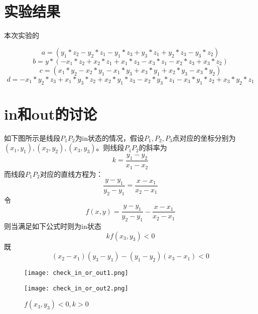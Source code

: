 \documentclass[10pt]{article}
\begin{document}
\section{实验结果}
本次实验的

$$a=(y_1*z_2 - y_2*z_1 - y_1*z_3+ y_3*z_1+ y_2*z_3- y_3*z_2)$$
$$b=y*(- x_1*z_2 + x_2*z_1+ x_1*z_3- x_3*z_1- x_2*z_3+ x_3*z_2)$$
$$c=(x_1*y_2  - x_2*y_1- x_1*y_3 + x_3*y_1+ x_2*y_3- x_3*y_2)$$
$$d=- x_1*y_2*z_3 + x_1*y_3*z_2 + x_2*y_1*z_3 - x_2*y_3*z_1 - x_3*y_1*z_2 + x_3*y_2*z_1$$


\section{in和out的讨论}
如下图所示是线段$P_1P_2$为in状态的情况，假设$P_1,P_2,P_3$点对应的坐标分别为$(x_1,y_1),(x_2,y_2),(x_3,y_3)$。则线段$P_1P_2$的斜率为$$k=\frac{y_1-y_2}{x_1-x_2}$$
而线段$P_1P_2$对应的直线方程为：
$$\frac{y-y_1}{y_2-y_1}=\frac{x-x_1}{x_2-x_1}$$
令
$$f(x,y)=\frac{y-y_1}{y_2-y_1}-\frac{x-x_1}{x_2-x_1}$$
则当满足如下公式时则为in状态
$$kf(x_3,y_3)<0$$
既
$$(x_2-x_1)(y_3-y_1)-(y_1-y_2)(x_3-x_1)<0$$
\begin{figure}[H]
\begin{center}
\begin{minipage}[t]{0.45\linewidth}
\texttt{[image: check\_in\_or\_out1.png]}
\caption{$f(x_3,y_3)>0,k<0$}
\end{minipage}
\begin{minipage}[t]{0.45\linewidth}
\texttt{[image: check\_in\_or\_out2.png]}
\caption{$f(x_3,y_3)<0,k>0$}
\end{minipage}
\end{center}

\end{figure}
\end{document}
